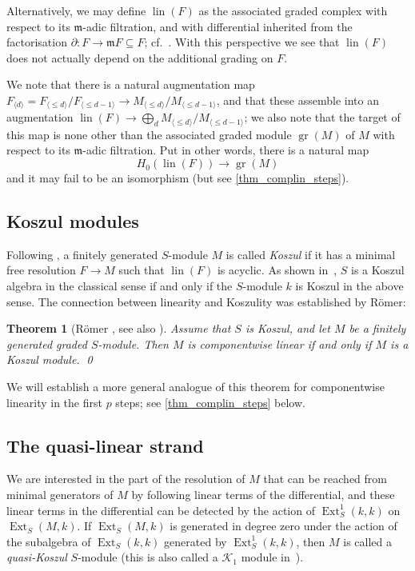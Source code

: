 \documentclass[a4paper,10pt]{amsart}
\newtheorem{theorem}{Theorem}[section]
\theoremstyle{definition}
\theoremstyle{remark}
\DeclareMathOperator{\gr}{gr}
\DeclareMathOperator{\lin}{lin}
\newcommand{\fm}{\mathfrak{m}}
\DeclareMathOperator{\Ext}{Ext}
\begin{document}
Alternatively, we may define $\lin(F)$ as the associated graded complex with respect to its $\fm$-adic filtration, and with differential inherited from the factorisation $\partial\colon F\to \fm F\subseteq F$; cf.\ \cite{HI}. With this perspective we see that $\lin(F)$ does not actually depend on the additional grading on $F$.

We note that there is a natural augmentation map $F_{\langle d \rangle}=F_{\langle \leqslant d\rangle}/F_{\langle \leqslant d-1\rangle} \to M_{\langle \leqslant d\rangle}/M_{\langle \leqslant d-1\rangle}$, and that these assemble into an augmentation $\lin(F)\to \bigoplus_d M_{\langle \leqslant d\rangle}/M_{\langle \leqslant d-1\rangle}$; we also note that the target of this map is none other than the associated graded module $\gr(M)$ of $M$ with respect to its $\fm$-adic filtration. Put in other words, there is a natural map
\begin{equation}\label{eq_H0lin}
H_0(\lin(F))\to \gr(M)
\end{equation}
and it may fail to be an isomorphism (but see \cref{thm_complin_steps}).



\subsection*{Koszul modules} Following \cite{HI}, a finitely generated $S$-module $M$ is called \emph{Koszul} if it has a minimal free resolution $F\to M$ such that $\lin(F)$ is acyclic. As shown in~\cite[Remark~1.10]{HI}, $S$ is a Koszul algebra in the classical sense if and only if the $S$-module $k$ is Koszul in the above sense. The connection between linearity and Koszulity was established by R\"omer:

\begin{theorem}[R\"omer {\cite{R}, see also \cite[Theorem~5.6]{IR}}] \label{thm_complin_iff_Kos}
Assume that $S$ is Koszul, and let $M$ be a finitely generated graded $S$-module. Then $M$ is componentwise linear if and only if $M$ is a Koszul module. \qed
\end{theorem}

We will establish a more general analogue of this theorem for componentwise linearity in the first $p$ steps; see \cref{thm_complin_steps} below.



\subsection*{The quasi-linear strand} 
We are interested in the part of the resolution of $M$ that can be reached from minimal generators of $M$ by following linear terms of the differential, and these linear terms in the differential can be detected by the action of $\Ext_S^1(k,k)$ on $\Ext_S(M,k)$. If $\Ext_S(M,k)$ is generated in degree zero under the action of the subalgebra of $\Ext_S(k,k)$ generated by $\Ext_S^1(k,k)$, then $M$ is called a \emph{quasi-Koszul} $S$-module \cite{GM} (this is also called a $\mathcal{K}_1$ module in~\cite{CS}). 
\end{document}
